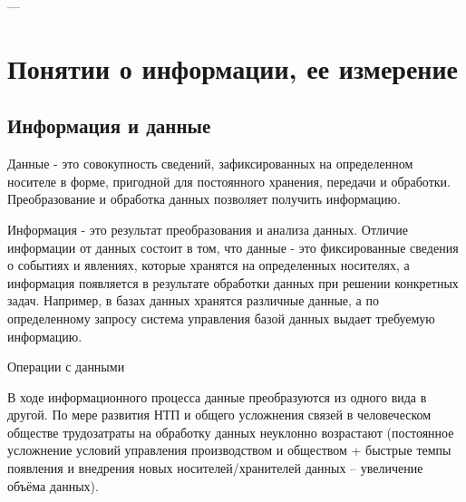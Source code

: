 \documentclass[a4paper]{article}
\begin{document}
---

\section{Понятии о информации, ее измерение}

\subsection{Информация и данные}

 Данные - это совокупность сведений, зафиксированных на определенном носителе в форме, пригодной для постоянного хранения, передачи и обработки. Преобразование и обработка данных позволяет получить информацию.

Информация - это результат преобразования и анализа данных. Отличие информации от данных состоит в том, что данные - это фиксированные сведения о событиях и явлениях, которые хранятся на определенных носителях, а информация появляется в результате обработки данных при решении конкретных задач. Например, в базах данных хранятся различные данные, а по определенному запросу система управления базой данных выдает требуемую информацию.

 Операции с данными

В ходе информационного процесса данные преобразуются из одного вида в другой. По мере развития НТП и общего усложнения связей в человеческом обществе трудозатраты на обработку данных неуклонно возрастают (постоянное усложнение условий управления производством и обществом + быстрые темпы появления и внедрения новых носителей/хранителей данных – увеличение объёма данных).
\end{document}
